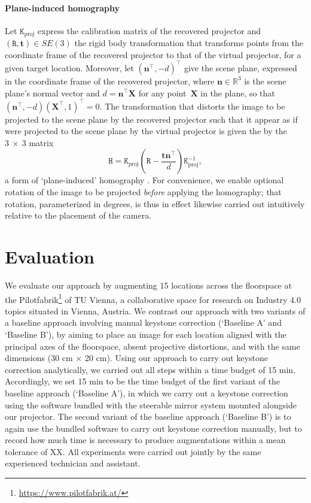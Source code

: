 \documentclass[review]{elsarticle}
\begin{document}
\paragraph{Plane-induced homography} Let $\mathtt{K}_\text{proj}$ express the calibration matrix of the recovered projector and $(\mathtt{R}, \mathbf{t}) \in SE(3)$ the rigid body transformation that transforms points from the coordinate frame of the recovered projector to that of the virtual projector, for a given target location. Moreover, let $(\mathbf{n}^\top, -d)^\top$ give the scene plane, expressed in the coordinate frame of the recovered projector, where $\mathbf{n} \in \mathbb{R}^3$ is the scene plane's normal vector and $d = \mathbf{n}^\top\mathbf{X}$ for any point~$\mathbf{X}$ in the plane, so that $(\mathbf{n}^\top, -d) (\mathbf{X}^\top, 1)^\top = 0$. The transformation that distorts the image to be projected to the scene plane by the recovered projector such that it appear as if were projected to the scene plane by the virtual projector is given the by the $3~\times~3$ matrix
\begin{equation}
\mathtt{H} = \mathtt{K}_\text{proj}\left(\mathtt{R} - \frac{\mathbf{t}\mathbf{n}^\top}{d}\right)\mathtt{K}_\text{proj}^{-1},
\label{homgen}
\end{equation}
a form of `plane-induced' homography \cite{Hartley2004}. For convenience, we enable optional rotation of the image to be projected \textit{before} applying the homography; that rotation, parameterized in degrees, is thus in effect likewise carried out intuitively relative to the placement of the camera.

\section{Evaluation}

We evaluate our approach by augmenting 15 locations across the floorspace at the Pilotfabrik\footnote{\url{https://www.pilotfabrik.at/}} of TU Vienna, a collaborative space for research on Industry 4.0 topics situated in Vienna, Austria. We contrast our approach with two variants of a baseline approach involving manual keystone correction (`Baseline A' and `Baseline B'), by aiming to place an image for each location aligned with the principal axes of the floorspace, absent projective distortions, and with the same dimensions (30 cm $\times{}$ 20 cm). Using our approach to carry out keystone correction analytically, we carried out all steps within a time budget of 15 min. Accordingly, we set 15 min to be the time budget of the first variant of the baseline approach (`Baseline A'), in which we carry out a  keystone correction using the software bundled with the steerable mirror system mounted alongside our projector. The second variant of the baseline approach (`Baseline B') is to again use the bundled software to carry out keystone correction manually, but to record how much time is necessary to produce augmentations within a mean tolerance of XX. All experiments were carried out jointly by the same experienced technician and assistant.
\end{document}
